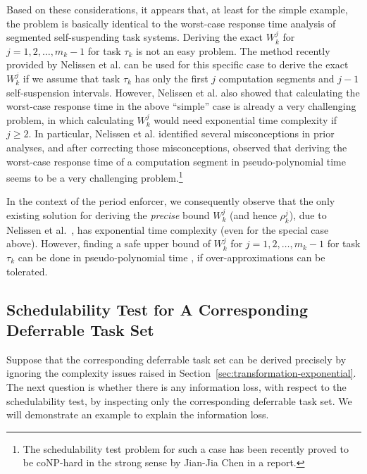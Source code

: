 Based on these considerations, it appears that, at least for the simple example, the problem is basically identical to the worst-case response time analysis of segmented self-suspending task systems. Deriving the exact $W_k^j$ for $j=1,2,\ldots,m_k-1$ for task $\tau_k$ is not an easy problem.  The method recently provided by Nelissen et al. \cite{ecrts15nelissen} can be used for this specific case to derive the exact $W_k^j$ if we assume that task $\tau_k$ has only the first $j$ computation segments and $j-1$ self-suspension intervals.  However, Nelissen et al. \cite{ecrts15nelissen} also showed that calculating the worst-case response time in the above ``simple'' case is already a very challenging problem, in which calculating $W_k^j$ would need exponential time complexity if $j \geq 2$.
In particular, Nelissen et al. \cite{ecrts15nelissen} identified several misconceptions in prior analyses, and after correcting those misconceptions, observed that deriving the worst-case response time of a computation segment in pseudo-polynomial time seems to be a very challenging problem.\footnote{The schedulability test problem for such a case has been recently proved to be coNP-hard in the strong sense by Jian-Jia Chen in a report.}

In the context of the period enforcer, we consequently observe that the only existing solution for deriving the \emph{precise} bound $W_k^{j}$ (and hence $\rho_k^j$), due to Nelissen et al.\ \cite{ecrts15nelissen},  has exponential time complexity (even for the special case above).
However, finding a safe upper bound of $W_k^j$ for $j=1,2,\ldots,m_k-1$ for task $\tau_k$ can be done in pseudo-polynomial time \cite{PH:rtss98,Huang:multiseg}, if over-approximations can be tolerated. 


\subsection{Schedulability Test for A Corresponding Deferrable Task Set}
\label{sec:schedulability-test-deferrable}

Suppose that the corresponding deferrable task set can be derived precisely by ignoring the complexity issues raised in Section~\ref{sec:transformation-exponential}. The next question is whether there is any information loss, with respect to the schedulability test, by inspecting only the corresponding deferrable task set. We will demonstrate an example to explain the information loss.

